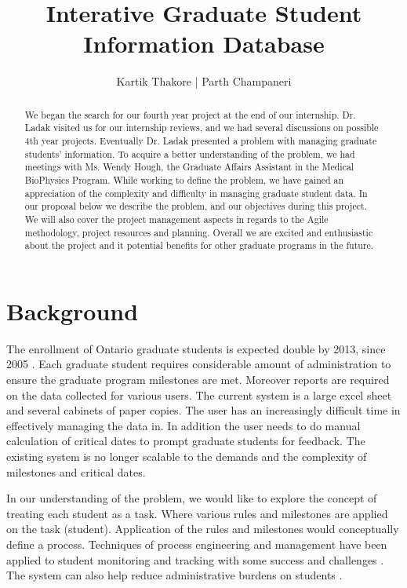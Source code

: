 \documentclass{journal}
\begin{document}

\title{Interative Graduate Student Information Database} 
\author{Kartik Thakore | Parth Champaneri}
\maketitle

\begin{abstract}
We began the search for our fourth year project at the end of our internship. Dr. Ladak visited us for our internship reviews, 
and we had several discussions on possible 4th year projects. Eventually Dr. Ladak presented a problem with managing graduate 
students' information. To acquire a better understanding of the problem, we had meetings with Ms. Wendy Hough, the Graduate Affairs
Assistant in the Medical BioPhysics Program. While working to define the problem, we have gained an appreciation of the complexity 
and difficulty in managing graduate student data. In our proposal below we describe the problem, and our objectives during this project. 
We will also cover the project management aspects in regards to the Agile methodology, project resources and planning. Overall we are 
excited and enthusiastic about the project and it potential benefits for other graduate programs in the future. 
\end{abstract}

\section{Background}

The enrollment of Ontario graduate students is expected double by 2013, since 2005 \cite{con_high}.  Each graduate student requires considerable
amount of administration to ensure the graduate program milestones are met. Moreover reports are required on the data collected for various users.
The current system is a large excel sheet and several cabinets of paper copies. The user has an increasingly difficult time in effectively managing 
the data in. In addition the user needs to do manual calculation of critical dates to prompt graduate students for feedback. 
The existing system is no longer scalable to the demands and the complexity of milestones and critical dates. 

In our understanding of the problem, we would like to explore the concept of treating each student as a task. Where various rules and milestones are
applied on the task (student). Application of the rules and milestones would conceptually define a process. Techniques of process engineering and management 
have been applied to student monitoring and tracking with some success and challenges \cite{flex}.  The system can also help reduce administrative
burdens on students \cite{adv}.  
\end{document}
